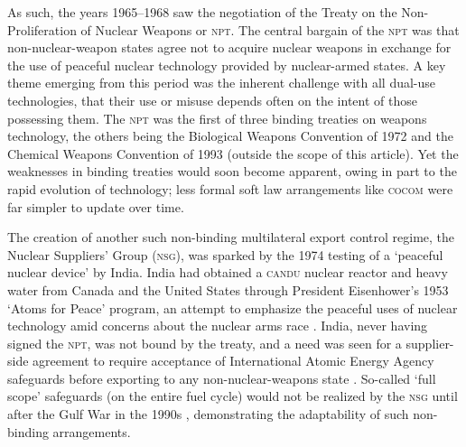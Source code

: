 \documentclass[12pt]{olfmemo}
\begin{document}
As such, the years 1965--1968 saw the negotiation of the Treaty on the Non-Proliferation of Nuclear Weapons or \textsc{npt}. The central bargain of the \textsc{npt} was that non-nuclear-weapon states agree not to acquire nuclear weapons in exchange for the use of peaceful nuclear technology provided by nuclear-armed states. A key theme emerging from this period was the inherent challenge with all dual-use technologies, that their use or misuse depends often on the intent of those possessing them. The \textsc{npt} was the first of three binding treaties on weapons technology, the others being the Biological Weapons Convention of 1972 and the Chemical Weapons Convention of 1993 \citep{Beck2019} (outside the scope of this article). Yet the weaknesses in binding treaties would soon become apparent, owing in part to the rapid evolution of technology; less formal soft law arrangements like \textsc{cocom} were far simpler to update over time.


The creation of another such non-binding multilateral export control regime, the Nuclear Suppliers' Group (\textsc{nsg}), was sparked by the 1974 testing of a `peaceful nuclear device' by India. India had obtained a \textsc{candu} nuclear reactor and heavy water from Canada and the United States through President Eisenhower's 1953 `Atoms for Peace' program, an attempt to emphasize the peaceful uses of nuclear technology amid concerns about the nuclear arms race \citep{Walker2001}. India, never having signed the \textsc{npt}, was not bound by the treaty, and a need was seen for a supplier-side agreement to require acceptance of International Atomic Energy Agency safeguards before exporting to any non-nuclear-weapons state \citep{Burr2014}. So-called `full scope' safeguards (on the entire fuel cycle) would not be realized by the \textsc{nsg} until after the Gulf War in the 1990s \citep{Anthony2007}, demonstrating the adaptability of such non-binding arrangements.
\end{document}
